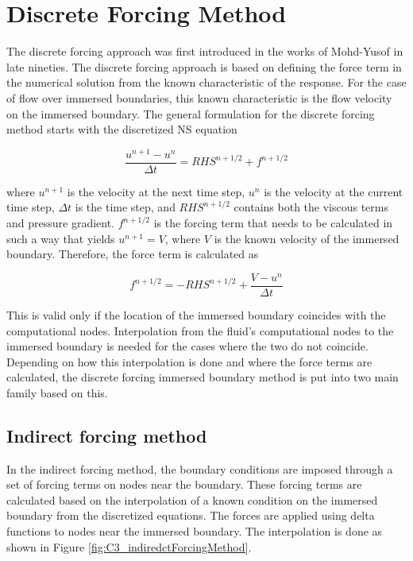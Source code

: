 \section{Discrete Forcing Method}
The discrete forcing approach was first introduced in the works of Mohd-Yusof \cite{mohd1997combined} in late nineties. The discrete forcing approach is based on defining the force term in the numerical solution from the known characteristic of the response. For the case of flow over immersed boundaries, this known characteristic is the flow velocity on the immersed boundary. The general formulation for the discrete forcing method starts with the discretized NS equation

\begin{equation}\label{eq:C3_discreteNSforIndirectForcing}
	\frac{u^{n+1} - u^n}{\Delta t} = RHS^{n+1/2} + f^{n+1/2}
\end{equation}

where $u^{n+1}$ is the velocity at the next time step, $u^n$ is the velocity at the current time step, $\Delta t$ is the time step, and $RHS^{n+1/2}$ contains both the viscous terms and pressure gradient. $f^{n+1/2}$ is the forcing term that needs to be calculated in such a way that yields $u^{n+1} = V$, where $V$ is the known velocity of the immersed boundary. Therefore, the force term is calculated as

\begin{equation}\label{eq:C3_indirectForceing}
	f^{n+1/2} = -RHS^{n+1/2} + \frac{V - u^n}{\Delta t}
\end{equation}

This is valid only if the location of the immersed boundary coincides with the computational nodes. Interpolation from the fluid's computational nodes to the immersed boundary is needed for the cases where the two do not coincide. Depending on how this interpolation is done and where the force terms are calculated, the discrete forcing immersed boundary method is put into two main family based on this.

\subsection{Indirect forcing method}
In the indirect forcing method, the boundary conditions are imposed through a set of forcing terms on nodes near the boundary. These forcing terms are calculated based on the interpolation of a known condition on the immersed boundary from the discretized equations. The forces are applied using delta functions to nodes near the immersed boundary. The interpolation is done as shown in Figure \ref{fig:C3_indiredctForcingMethod}.

